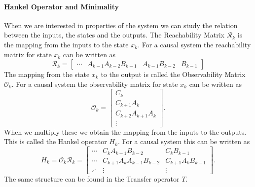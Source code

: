 \documentclass[doctype=mastersthesis,BCOR=15mm,biblatex]{ldvbook}%
\newcommand{\R}{\mathcal{R}} %
\newcommand{\Ob}{\mathcal{O}} %
\begin{document}
\paragraph{Hankel Operator and Minimality}
When we are interested in properties of the system we can study the relation between the inputs, the states and the outputs. 
The Reachability Matrix $\R_k$ is the mapping from the inputs to the state $x_k$. For a causal system the reachability matrix for state $x_k$ can be written as
\begin{equation}
	\R_k = \begin{bmatrix}
	 \cdots & A_{k-1}A_{k-2}B_{k-1} &A_{k-1}B_{k-2} &B_{k-1}
	\end{bmatrix}
\end{equation}
The mapping from the state $x_k$ to the output is called the Observability Matrix $\Ob_k$.
For a causal system the observability matrix for state $x_k$ can be written as
\begin{equation}
	\Ob_k = 
	\begin{bmatrix}
		C_k\\
		C_{k+1}A_k\\
		C_{k+2}A_{k+1}A_k\\
		\vdots
	\end{bmatrix}.
\end{equation}
When we multiply these we obtain the mapping from the inputs to the outputs. This is called the Hankel operator $H_k$.
For a causal system this can be written as
\begin{equation}\label{eq:H_def}
	H_k = \Ob_k \R_k = 
		\begin{bmatrix}
\cdots   & C_{k}A_{k-1}B_{k-2} & C_{k}B_{k-1} \\
\cdots   & C_{k+1}A_{k}A_{k-1}B_{k-2} & C_{k+1}A_{k}B_{k-1} \\
\iddots &\vdots &\vdots
\end{bmatrix}
.
\end{equation}
The same structure can be found in the Transfer operator $T$.%
\end{document}
